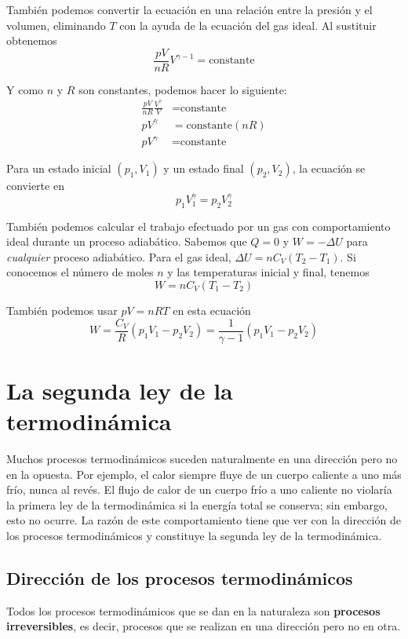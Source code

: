\documentclass[12pt]{article}
\begin{document}
  También podemos convertir la ecuación en una relación entre la presión y el volumen, eliminando $ T $ con la ayuda de la ecuación del gas ideal. Al sustituir obtenemos
  \[
  \frac{pV}{nR}V^{\gamma - 1} = \text{constante}
  \]
  
  Y como $ n $ y $ R $ son constantes, podemos hacer lo siguiente:
  \begin{align*}
    \frac{pV}{nR}\frac{V^{\gamma}}{V} &= \text{constante}\\
    pV^{\gamma} &= \text{constante}(nR)\\
    pV^{\gamma} &= \text{constante}
  \end{align*}

  Para un estado inicial $ (p_{1}, V_{1}) $ y un estado final $ (p_{2}, V_{2}) $, la ecuación se convierte en 
  \[
  p_{1}V_{1}^{\gamma} = p_{2}V_{2}^{\gamma}
  \]

  También podemos calcular el trabajo efectuado por un gas con comportamiento ideal durante un proceso adiabático. Sabemos que $ Q = 0 $ y $ W = -\Delta U $ para \textit{cualquier} proceso adiabático. Para el gas ideal, $ \Delta U = nC_{V}(T_{2} - T_{1}) $. Si conocemos el número de moles $ n $ y las temperaturas inicial y final, tenemos 
  \[
    W = nC_{V}(T_{1}-T_{2})
  \]

  También podemos usar $ pV = nRT $ en esta ecuación
  \[
    W = \frac{C_{V}}{R}(p_{1}V_{1} - p_{2}V_{2}) = \frac{1}{\gamma - 1}(p_{1}V_{1} - p_{2}V_{2})
  \]

  \section{La segunda ley de la termodinámica}
  Muchos procesos termodinámicos suceden naturalmente en una dirección pero no en la opuesta. Por ejemplo, el calor siempre fluye de un cuerpo caliente a uno más frío, nunca al revés. El flujo de calor de un cuerpo frío a uno caliente no violaría la primera ley de la termodinámica si la energía total se conserva; sin embargo, esto no ocurre. La razón de este comportamiento tiene que ver con la dirección de los procesos termodinámicos y constituye la segunda ley de la termodinámica.

  \subsection{Dirección de los procesos termodinámicos}
  Todos los procesos termodinámicos que se dan en la naturaleza son \textbf{procesos irreversibles}, es decir, procesos que se realizan en una dirección pero no en otra.
\end{document}
